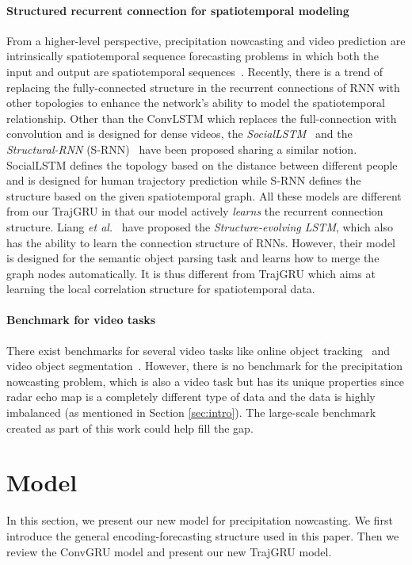 \documentclass{article}
\begin{document}
\paragraph{Structured recurrent connection for spatiotemporal modeling}
From a higher-level perspective, precipitation nowcasting and video prediction are intrinsically spatiotemporal sequence forecasting problems in which both the input and output are spatiotemporal sequences~\cite{xingjian2015convolutional}. Recently, there is a trend of replacing the fully-connected structure in the recurrent connections of RNN with other topologies to enhance the network's ability to model the spatiotemporal relationship. Other than the ConvLSTM which replaces the full-connection with convolution and is designed for dense videos, the \emph{SocialLSTM}~\cite{alahi2016social} and the \emph{Structural-RNN} (S-RNN)~\cite{jain2016structural} have been proposed sharing a similar notion. SocialLSTM defines the topology based on the distance between different people and is designed for human trajectory prediction while S-RNN defines the structure based on the given spatiotemporal graph. All these models are different from our TrajGRU in that our model actively \emph{learns} the recurrent connection structure. Liang \emph{et al.}~\cite{liang2017interpretable} have proposed the \emph{Structure-evolving LSTM}, which also has the ability to learn the connection structure of RNNs. However, their model is designed for the semantic object parsing task and learns how to merge the graph nodes automatically. It is thus different from TrajGRU which aims at learning the local correlation structure for spatiotemporal data.
\vspace{-0.8em}
\paragraph{Benchmark for video tasks}
There exist benchmarks for several video tasks like online object tracking~\cite{wu2013online} and video object segmentation~\cite{perazzi2016benchmark}. However, there is no benchmark for the precipitation nowcasting problem, which is also a video task but has its unique properties since radar echo map is a completely different type of data and the data is highly imbalanced (as mentioned in Section \ref{sec:intro}). The large-scale benchmark created as part of this work could help fill the gap.

\section{Model}
In this section, we present our new model for precipitation nowcasting. We first introduce the general encoding-forecasting structure used in this paper. Then we review the ConvGRU model and present our new TrajGRU model.
\end{document}
